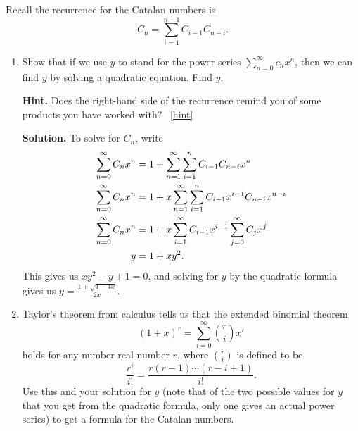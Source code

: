 \documentclass{book}
\begin{document}
\setcounter{project}{271}
\addtocounter{project}{-1}
\begin{activity}[]\label{CatalanRecurrence}
\hypertarget{p-1412}{}%
Recall the recurrence for the Catalan numbers is%
\begin{equation*}
C_n = \sum_{i=1}^{n-1} C_{i-1}C_{n-i}\text{.}
\end{equation*}
%
\begin{enumerate}[font=\bfseries,label=(\alph*),ref=\alph*]
\item\label{task-255} \hypertarget{p-1413}{}%
Show that if we use \(y\) to stand for the power series \(\sum_{n=0}^\infty c_nx^n\), then we can find \(y\) by solving a quadratic equation. Find \(y\).%
\par\smallskip%
\noindent\textbf{Hint.}\hypertarget{hint-174}{}\quad%
\hypertarget{p-1414}{}%
Does the right-hand side of the recurrence remind you of some products you have worked with?%
~\hfill{\tiny\hyperlink{a-271.a}{[hint]}\hypertarget{q-271.a}{}}\par\smallskip%
\noindent\textbf{Solution.}\hypertarget{solution-187}{}\quad%
\hypertarget{p-1415}{}%
To solve for \(C_n\), write%
\begin{align*}
\sum_{n=0}^\infty C_nx^n &= 1+\sum_{n=1}^\infty\sum_{i=1}^nC_{i-1}C_{n-i}x^n\\
\sum_{n=0}^\infty C_nx^n
&= 1+x\sum_{n=1}^\infty\sum_{i=1}^nC_{i-1}x^{i-1}C_{n-i}x^{n-i}\\
\sum_{n=0}^\infty C_nx^n
&= 1+x\sum_{i=1}^\infty C_{i-1}x^{i-1}\sum_{j=0}^\infty C_{j}x^{j}\\
y &= 1 + xy^2\text{.}
\end{align*}
This gives us \(xy^2-y+1=0\), and solving for \(y\) by the quadratic formula gives us \(y=\frac{1\pm \sqrt{1-4x}}{2x}\).%
\item\label{task-256} \hypertarget{p-1416}{}%
Taylor's theorem from calculus tells us that the extended binomial theorem%
\begin{equation*}
(1+x)^r = \sum_{i=0}^\infty \binom{r}{i}x^i
\end{equation*}
holds for any number real number \(r\), where \(\binom{r}{i}\) is defined to be%
\begin{equation*}
\frac{r^{\underline{i}}}{i!} = \frac{r(r-1)\cdots(r-i+1)}{i!}\text{.}
\end{equation*}
Use this and your solution for \(y\) (note that of the two possible values for \(y\) that you get from the quadratic formula, only one gives an actual power series) to get a formula for the Catalan numbers.%

\end{enumerate}
\end{activity}
\end{document}
